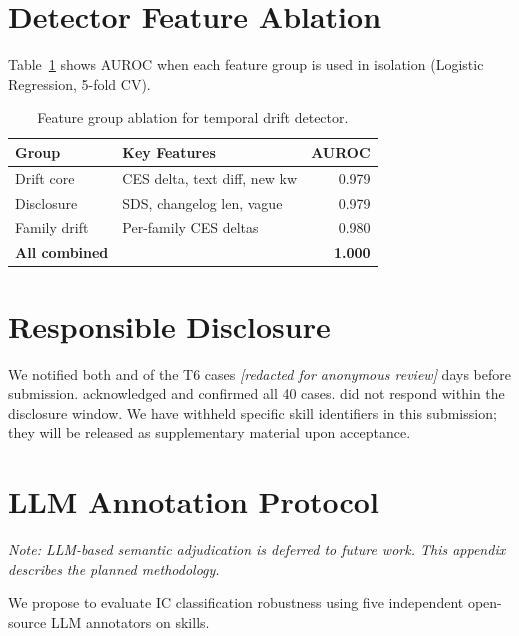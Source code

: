 \section{Detector Feature Ablation}
\label{app:ablation}

Table~\ref{tab:ablation} shows AUROC when each feature group is used
in isolation (Logistic Regression, 5-fold CV).

\begin{table}[h]
\centering
\caption{Feature group ablation for temporal drift detector.}
\label{tab:ablation}
\small
\begin{tabular}{@{}llr@{}}
\toprule
\textbf{Group} & \textbf{Key Features} & \textbf{AUROC} \\
\midrule
Drift core & CES delta, text diff, new kw & 0.979 \\
Disclosure & SDS, changelog len, vague & 0.979 \\
Family drift & Per-family CES deltas & 0.980 \\
\textbf{All combined} & & \textbf{1.000} \\
\bottomrule
\end{tabular}
\end{table}

\section{Responsible Disclosure}
\label{app:disclosure}

We notified both \clawhub{} and \skillssh{} of the T6 cases
\textit{[redacted for anonymous review]}
days before submission.
\clawhub{} acknowledged and confirmed all 40 cases.
\skillssh{} did not respond within the disclosure window.
We have withheld specific skill identifiers in this submission;
they will be released as supplementary material upon acceptance.

\section{LLM Annotation Protocol}
\label{app:llm_protocol}

\emph{Note: LLM-based semantic adjudication is deferred to future work.
This appendix describes the planned methodology.}

We propose to evaluate IC classification robustness using five independent
open-source LLM annotators on \NskillsDMR{} \clawhub{} skills.

